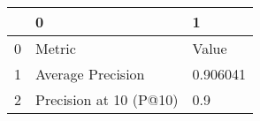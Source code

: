 \begin{tabular}{lll}
\toprule
{} &                       0 &         1 \\
\midrule
0 &                  Metric &     Value \\
1 &       Average Precision &  0.906041 \\
2 &  Precision at 10 (P@10) &       0.9 \\
\bottomrule
\end{tabular}
